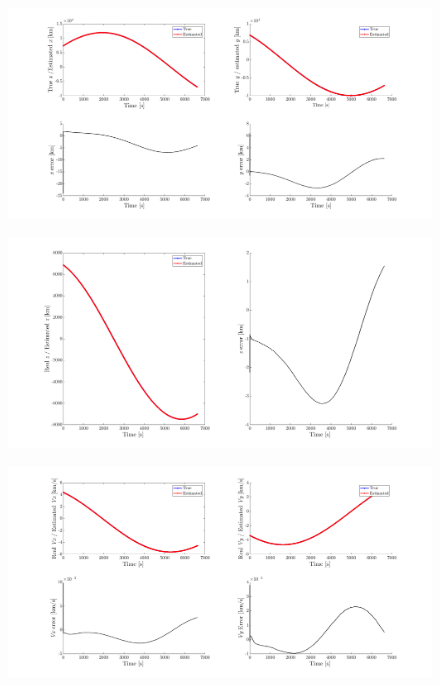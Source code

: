 \begin{figure}[H]
    \centering
    \includegraphics[width=\textwidth]{Figures/xy-error-5observers-250km.png}
    \caption{}
    \label{fig: xyerror-250-5}
\end{figure}
\begin{figure}[H]
    \centering
    \includegraphics[width=\textwidth]{Figures/z-error-5observers-250km.png}
    \caption{}
    \label{fig: zerror-250-5}
\end{figure}
\begin{figure}[H]
    \centering
    \includegraphics[width=\textwidth]{Figures/Vx-vy-error-5observers-250km.png}
    \caption{}
    \label{fig: vxyerror-250-5}
\end{figure}
